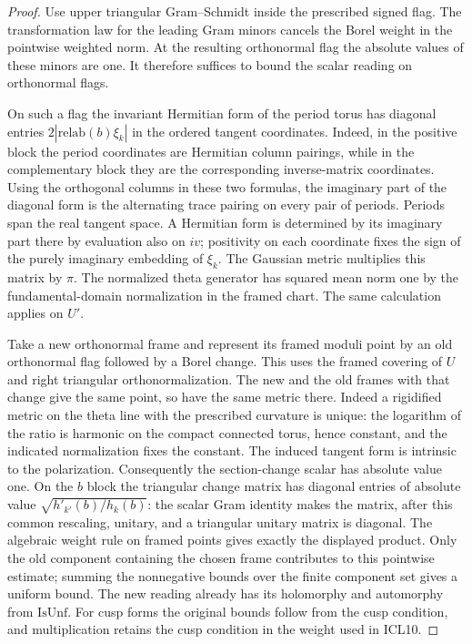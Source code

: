 \begin{proof}
Use upper triangular Gram--Schmidt inside the prescribed signed flag.
The transformation law for the leading Gram minors cancels the Borel
weight in the pointwise weighted norm. At the resulting orthonormal
flag the absolute values of these minors are one. It therefore
suffices to bound the scalar reading on orthonormal flags.

On such a flag the invariant Hermitian form of the period torus
has diagonal entries $2|\mathrm{relab}(b)\xi_k|$ in the ordered
tangent coordinates. Indeed, in the positive block the period
coordinates are Hermitian column pairings, while in the
complementary block they are the corresponding inverse-matrix
coordinates. Using the orthogonal columns in these two formulas,
the imaginary part of the diagonal form is the alternating trace
pairing on every pair of periods. Periods span the real tangent
space. A Hermitian form is determined by its imaginary part there
by evaluation also on $iv$; positivity on each coordinate fixes
the sign of the purely imaginary embedding of $\xi_k$.
The Gaussian metric multiplies this matrix by $\pi$. The normalized
theta generator has squared mean norm one by the fundamental-domain
normalization in the framed chart. The same calculation applies on
$U'$.

Take a new orthonormal frame and represent its framed moduli point
by an old orthonormal flag followed by a Borel change. This uses
the framed covering of $U$ and right triangular orthonormalization.
The new and the old frames with that change give the same point,
so have the same metric there. Indeed a rigidified metric on the
theta line with the prescribed curvature is unique: the logarithm
of the ratio is harmonic on the compact connected torus, hence
constant, and the indicated normalization fixes the constant. The
induced tangent form is intrinsic to the polarization. Consequently
the section-change scalar has absolute value one. On the $b$ block
the triangular change matrix has diagonal entries of absolute value
$\sqrt{h'_{k'}(b)/h_k(b)}$: the scalar Gram identity makes the
matrix, after this common rescaling, unitary, and a triangular
unitary matrix is diagonal. The algebraic weight rule on framed
points gives exactly the displayed product. Only the old component
containing the chosen frame contributes to this pointwise estimate;
summing the nonnegative bounds over the finite component set gives
a uniform bound. The new reading already has its holomorphy and
automorphy from $\mathrm{IsUnf}$. For cusp forms the original bounds
follow from the cusp condition, and multiplication retains the cusp
condition in the weight used in ICL10.
\end{proof}

